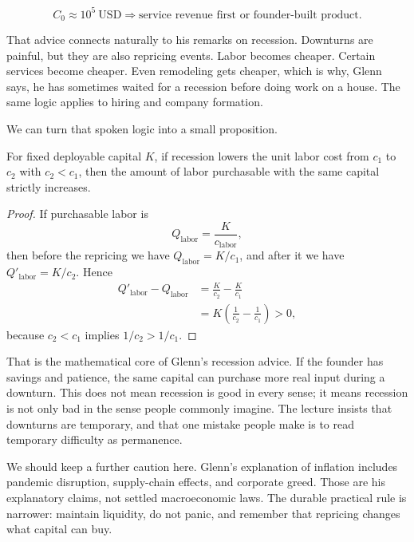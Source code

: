 \begin{equation}
C_{0} \approx 10^{5}\ \mathrm{USD}
\Longrightarrow \text{service revenue first or founder-built product.}
\end{equation}

That advice connects naturally to his remarks on recession. Downturns are painful, but they are also repricing events. Labor becomes cheaper. Certain services become cheaper. Even remodeling gets cheaper, which is why, Glenn says, he has sometimes waited for a recession before doing work on a house. The same logic applies to hiring and company formation.

We can turn that spoken logic into a small proposition.

\begin{proposition}
For fixed deployable capital \(K\), if recession lowers the unit labor cost from \(c_{1}\) to \(c_{2}\) with \(c_{2}<c_{1}\), then the amount of labor purchasable with the same capital strictly increases.
\end{proposition}

\begin{proof}
If purchasable labor is
\begin{equation}
Q_{\mathrm{labor}}=\frac{K}{c_{\mathrm{labor}}},
\end{equation}
then before the repricing we have \(Q_{\mathrm{labor}}=K/c_{1}\), and after it we have \(Q'_{\mathrm{labor}}=K/c_{2}\). Hence
\begin{align}
Q'_{\mathrm{labor}}-Q_{\mathrm{labor}}
&= \frac{K}{c_{2}}-\frac{K}{c_{1}} \\
&= K\left(\frac{1}{c_{2}}-\frac{1}{c_{1}}\right) > 0,
\end{align}
because \(c_{2}<c_{1}\) implies \(1/c_{2}>1/c_{1}\).
\end{proof}

That is the mathematical core of Glenn's recession advice. If the founder has savings and patience, the same capital can purchase more real input during a downturn. This does not mean recession is good in every sense; it means recession is not only bad in the sense people commonly imagine. The lecture insists that downturns are temporary, and that one mistake people make is to read temporary difficulty as permanence.

We should keep a further caution here. Glenn's explanation of inflation includes pandemic disruption, supply-chain effects, and corporate greed. Those are his explanatory claims, not settled macroeconomic laws. The durable practical rule is narrower: maintain liquidity, do not panic, and remember that repricing changes what capital can buy.

